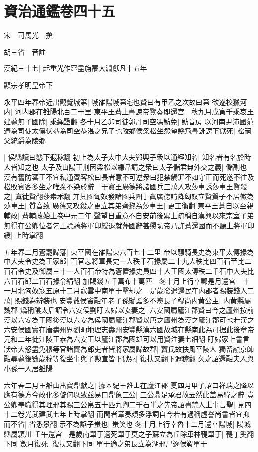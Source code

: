 \chapter{資治通鑑卷四十五}
宋　司馬光　撰

胡三省　音註

漢紀三十七|{
	起重光作噩盡旃蒙大淵獻凡十五年}


顯宗孝明皇帝下

永平四年春帝近出觀覽城第|{
	城雒陽城第宅也賢曰有甲乙之次故曰第}
欲遂校獵河内|{
	河内郡在雒陽北百二十里}
東平王蒼上書諫帝覽奏即還宫　秋九月戊寅千乘哀王建薨無子國除|{
	乘䋲證翻}
冬十月乙卯司徒郭丹司空馮魴免|{
	魴音房}
以河南尹沛國范遷為司徒太僕伏恭為司空恭湛之兄子也陵鄉侯梁松坐怨望縣飛書誹謗下獄死|{
	松嗣父統爵為陵鄉}


|{
	侯縣讀曰懸下遐稼翻}
初上為太子太中大夫鄭興子衆以通經知名|{
	知名者有名於時人皆知之也}
太子及山陽王荆因梁松以縑帛請之衆曰太子儲君無外交之義|{
	儲副也}
漢有舊防蕃王不宜私通賓客松曰長者意不可逆衆曰犯禁觸罪不如守正而死遂不往及松敗賓客多坐之唯衆不染於辭　于寘王廣德將諸國兵三萬人攻莎車誘莎車王賢殺之|{
	寘徒賢翻莎素禾翻}
并其國匈奴發諸國兵圍于寘廣德請降匈奴立賢質子不居徵為莎車王|{
	質音致}
廣德又攻殺之更立其弟齊黎為莎車王|{
	更工衡翻}
東平王蒼自以至親輔政|{
	蒼輔政始上卷中元二年}
聲望日重意不自安前後累上疏稱自漢興以來宗室子弟無得在公卿位者乞上驃騎將軍印綬退就藩國辭甚懇切帝乃許蒼還國而不聽上將軍印綬|{
	上時掌翻}


五年春二月蒼罷歸藩|{
	東平國在雒陽東六百七十二里}
帝以驃騎長史為東平太傅掾為中大夫令史為王家郎|{
	百官志將軍長史一人秩千石掾屬二十九人秩比四百石至比二百石令史及御屬三十一人百石帝特為蒼置掾史員四十人王國太傅秩二千石中大夫比六百石郎二百石掾俞絹翻}
加賜錢五千萬布十萬匹　冬十月上行幸鄴是月還宮　十一月北匈奴寇五原十二月寇雲中南單于擊却之　是歲發遣邊民在内郡者賜裝錢人二萬|{
	賜錢為辨裝也}
安豐戴侯竇融年老子孫縱誕多不灋長子穆尚内黄公主|{
	内黄縣屬魏郡}
矯稱隂太后詔令六安侯劉盱去婦以女妻之|{
	六安國屬廬江郡賢曰今之廬州按前漢以六安為王國後漢以六安為侯國屬廬江郡賢以唐之廬州為漢之廬江郡可也若漢之六安侯國實在唐夀州界劉昫地理志夀州安豐縣漢六國故城在縣南此為可据此後章帝元和二年徙江陵王恭為六安王以廬江郡為國却可以用賢注妻七細翻}
盱婦家上書言狀帝大怒盡免穆等官諸竇為郎吏者皆將家屬歸故郡|{
	竇氏故扶風平陵人}
獨留融京師融尋薨後數歲穆等復坐事與子勲宣皆下獄死|{
	復扶又翻下遐稼翻}
久之詔還融夫人與小孫一人居雒陽

六年春二月王雒山出寶鼎獻之|{
	據本紀王雒山在廬江郡}
夏四月甲子詔曰祥瑞之降以應有德方今政化多僻何以致兹易曰鼎象三公|{
	三公鼎足承君故云然此盖易緯之辭}
豈公卿奉職得其理邪其賜三公帛五十匹九卿二千石半之先帝詔書禁人上事言聖|{
	見四十二卷光武建武七年上時掌翻}
而間者章奏頗多浮詞自今若有過稱虛譽尚書皆宜抑而不省|{
	省悉景翻}
示不為諂子蚩也|{
	蚩笑也}
冬十月上行幸魯十二月還幸陽城|{
	陽城縣屬頴川}
壬午還宫　是歲南單于適死單于莫之子蘇立為丘除車林鞮單于|{
	鞮丁奚翻下同}
數月復死|{
	復扶又翻下同}
單于適之弟長立為湖邪尸逐侯鞮單于

